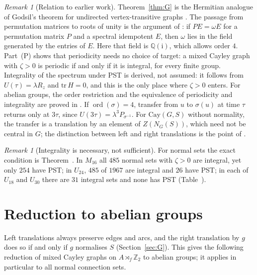 \documentclass[preprint,11pt]{elsarticle}
\makeatletter
\theoremstyle{definition}
\theoremstyle{remark}
\newtheorem{remark}[theorem]{Remark}
\DeclareMathOperator{\ord}{ord}
\newcommand{\Z}{\mathbb Z}
\newcommand{\Q}{\mathbb Q}
\newcommand{\ii}{\mathrm i}
\newcommand{\SR}[1]{\@nameuse{SR@#1}}
\makeatother
\begin{document}
\begin{remark}[Relation to earlier work]\label{rem:lit}
Theorem~\ref{thm:G} is the Hermitian analogue of Godsil's theorem for undirected vertex-transitive graphs \cite{GodsilPeriodic,GodsilSTG}. The passage from permutation matrices to roots of unity is the argument of \cite[Cor.~2.3]{CPRS}: if $PE=\omega E$ for a permutation matrix $P$ and a spectral idempotent $E$, then $\omega$ lies in the field generated by the entries of $E$. Here that field is $\Q(\ii)$, which allows order $4$. Part~(P) shows that periodicity needs no choice of target: a mixed Cayley graph with $\zeta>0$ is periodic if and only if it is integral, for every finite group. Integrality of the spectrum under PST is derived, not assumed: it follows from $U(\tau)=\lambda R_z$ and $\mathrm{tr}\,H=0$, and this is the only place where $\zeta>0$ enters. For abelian groups, the order restriction and the equivalence of periodicity and integrality are proved in \cite{KG}. If $\ord(\sigma)=4$, transfer from $u$ to $\sigma(u)$ at time $\tau$ returns only at $3\tau$, since $U(3\tau)=\lambda^3P_{\sigma^{-1}}$. For $\mathrm{Cay}(G,S)$ without normality, the transfer is a translation by an element of $Z(N_G(S))$, which need not be central in $G$; the distinction between left and right translations is the point of \cite[Section~3]{AG}.
\end{remark}

\begin{remark}[Integrality is necessary, not sufficient]\label{rem:int}
For normal sets the exact condition is Theorem~\SR{thm:C}. In $M_{16}$ all $485$ normal sets with $\zeta>0$ are integral, yet only $254$ have PST; in $U_{24}$, $485$ of $1967$ are integral and $26$ have PST; in each of $U_{18}$ and $U_{30}$ there are $31$ integral sets and none has PST (Table~\SR{tab:normal}).
\end{remark}

\section{Reduction to abelian groups}\label{sec:red}

Left translations always preserve edges and arcs, and the right translation by $g$ does so if and only if $g$ normalises $S$ (Section~\ref{sec:G}). This gives the following reduction of mixed Cayley graphs on $A\rtimes_f\Z_2$ to abelian groups; it applies in particular to all normal connection sets.
\end{document}
